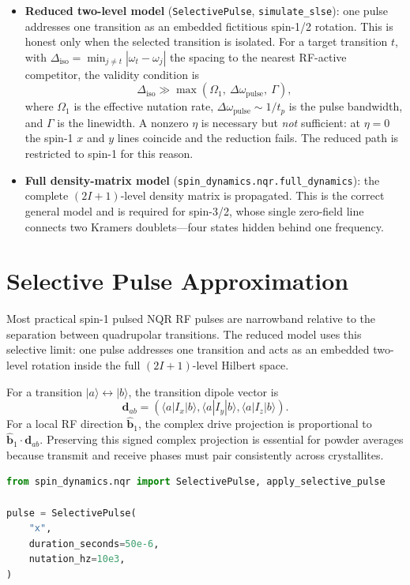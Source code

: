 \documentclass[11pt,oneside]{report}
\newcommand{\code}[1]{\texttt{#1}}
\begin{document}
\begin{itemize}
\item \textbf{Reduced two-level model} (\code{SelectivePulse},
\code{simulate\_slse}): one pulse addresses one transition as an embedded
fictitious spin-1/2 rotation. This is honest only when the selected transition
is isolated. For a target transition \(t\), with
\(\Delta_{\mathrm{iso}}=\min_{j\neq t}|\omega_t-\omega_j|\) the spacing to the
nearest RF-active competitor, the validity condition is
\[
  \Delta_{\mathrm{iso}} \gg
  \max\!\left(\Omega_1,\ \Delta\omega_{\mathrm{pulse}},\ \Gamma\right),
\]
where \(\Omega_1\) is the effective nutation rate, \(\Delta\omega_{\mathrm{pulse}}\sim 1/t_p\)
is the pulse bandwidth, and \(\Gamma\) is the linewidth. A nonzero \(\eta\) is
necessary but \emph{not} sufficient: at \(\eta=0\) the spin-1 \(x\) and \(y\)
lines coincide and the reduction fails. The reduced path is restricted to
spin-1 for this reason.
\item \textbf{Full density-matrix model}
(\code{spin\_dynamics.nqr.full\_dynamics}): the complete \((2I+1)\)-level
density matrix is propagated. This is the correct general model and is required
for spin-3/2, whose single zero-field line connects two Kramers doublets---four
states hidden behind one frequency.
\end{itemize}

\section{Selective Pulse Approximation}

Most practical spin-1 pulsed NQR RF pulses are narrowband relative to the
separation between quadrupolar transitions. The reduced model uses this
selective limit: one pulse addresses one transition and acts as an embedded
two-level rotation inside the full \((2I+1)\)-level Hilbert space.

For a transition \(|a\rangle \leftrightarrow |b\rangle\), the transition dipole
vector is
\[
  \mathbf{d}_{ab} =
  \left(
    \langle a|I_x|b\rangle,
    \langle a|I_y|b\rangle,
    \langle a|I_z|b\rangle
  \right).
\]
For a local RF direction \(\hat{\mathbf{b}}_1\), the complex drive projection
is proportional to \(\hat{\mathbf{b}}_1\cdot\mathbf{d}_{ab}\). Preserving this
signed complex projection is essential for powder averages because transmit
and receive phases must pair consistently across crystallites.

\begin{lstlisting}[language=Python]
from spin_dynamics.nqr import SelectivePulse, apply_selective_pulse

pulse = SelectivePulse(
    "x",
    duration_seconds=50e-6,
    nutation_hz=10e3,
)
\end{lstlisting}
\end{document}
